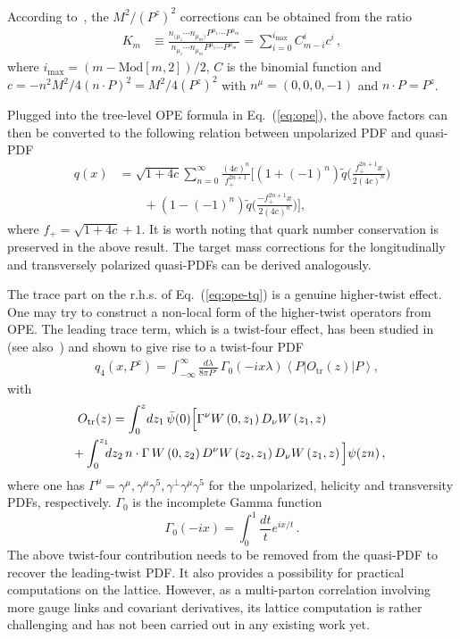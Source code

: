 \documentclass[aps,rmp,reprint,amsmath,amssymb,graphicx,longbibliography]{revtex4-1} %
\newcommand{\nn}{\nonumber}
\DeclareRobustCommand{\eq}[1]{Eq.~(\ref{eq:#1})}
\begin{document}
According to~\cite{Chen:2016utp}, the $M^2/(P^z)^2$ corrections can be obtained from the ratio
%
\begin{align}
	K_m  &\equiv
	\frac{n_{(\mu_1}\cdots n_{\mu_m)}
		P^{\mu_1}\cdots P^{\mu_m}}{n_{\mu_1}\cdots n_{\mu_m}
		P^{\mu_1}\cdots P^{\mu_m}} = \sum_{i=0}^{i_\text{max}} C_{m-i}^i c^i   \label{Kn}\,,
\end{align}
where $i_\text{max}=(m-\text{Mod}[m,2])/2$,
$C$ is the binomial function and
$c=-n^2 M^2/4\left(n\cdot P\right)^2 = M^2/4 (P^z)^2$
with $n^\mu = (0,0,0,-1)$ and $n \cdot P=P^z$.

Plugged into the tree-level OPE formula in \eq{ope}, the above factors can then be converted to the following relation between unpolarized PDF and quasi-PDF~\cite{Chen:2016utp}
\begin{align}
	q(x)&=\sqrt{1+4c}\sum_{n=0}^\infty \frac{(4c)^n}{f_+^{2n+1}}\Big[(1+(-1)^n)\tilde q\Big(\frac{f_+^{2n+1}x}{2(4c)^n}\Big)\nn\\
	&\qquad+(1-(-1)^n)\tilde q\Big(\frac{-f_+^{2n+1}x}{2(4c)^n}\Big)\Big],
\end{align}
where $f_{+}=\sqrt{1+4c}+ 1$. It is worth noting that quark number conservation is preserved in the above result. The target mass corrections for the longitudinally and transversely polarized quasi-PDFs can be derived analogously.

The trace part on the r.h.s. of \eq{ope-tq} is a genuine higher-twist effect. One may try to construct a non-local form of the higher-twist operators from OPE. The leading trace term, which is a twist-four effect, has been studied in~\cite{Chen:2016utp} (see also~\cite{Balitsky:1987bk}) and shown to give rise to a twist-four PDF
\begin{align}\label{tildeq-twist4}
	&{q}_\text{4}(x,P^z)
	=  \int_{-\infty}^\infty \!\frac{d\lambda}{8\pi P^z}\,
	\Gamma_0\left(-ix\lambda\right)
	\left\langle P\left\vert  O_\text{tr}(z)\right\vert P\right\rangle ,
\end{align}
with
\begin{align}
	&O_\text{tr}(z) =
	\int_0^z \!dz_1\, \bar{\psi}(0) \Big[
	\Gamma^\nu W\left(0,z_1\right) D_\nu W\left(z_1,z\right)\\
	&\hspace{-.5em}+ \int_0^{z_1} \!\! \! dz_2\,  n \cdot  \Gamma\,
	W\left(0,z_2\right) D^\nu W\left(z_2,z_1\right) D_\nu
	W\left(z_1,z\right) \Big] \psi(z n)\,,\nn
\end{align}
where one has $\Gamma^{\mu}=\gamma^{\mu}, \gamma^{\mu}\gamma^5, \gamma^\perp\gamma^{\mu}\gamma^5$ for the unpolarized, helicity and transversity PDFs, respectively. $\Gamma_0$ is the incomplete Gamma function
\begin{equation}
	\Gamma_0\left(-ix\right) = \int_0^1 \frac{dt}{t} e^{ix/t} \,.
\end{equation}
The above twist-four contribution needs to be removed from the quasi-PDF to recover the leading-twist PDF. It also provides a possibility for practical computations on the lattice. However, as a multi-parton correlation involving more gauge links and covariant derivatives, its lattice computation is rather challenging and has not been carried out in any existing work yet.
\end{document}
